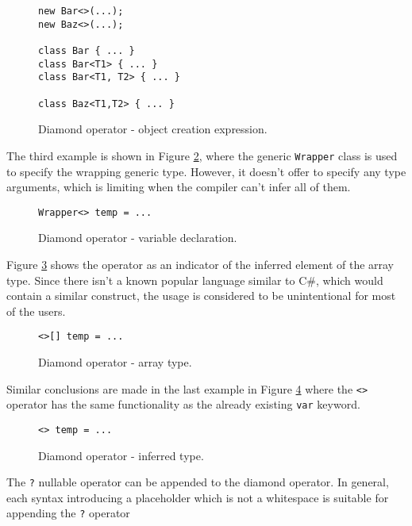 \begin{figure}[h]
\begin{lstlisting}[style=csharp]
new Bar<>(...);
new Baz<>(...);

class Bar { ... }
class Bar<T1> { ... }
class Bar<T1, T2> { ... }

class Baz<T1,T2> { ... }
\end{lstlisting}
\caption{Diamond operator - object creation expression.}
\label{img41:opDi2}
\end{figure}
\par
The third example is shown in Figure \ref{img42:opDi3}, where the generic \texttt{Wrapper} class is used to specify the wrapping generic type. 
However, it doesn’t offer to specify any type arguments, which is limiting when the compiler can’t infer all of them.
\begin{figure}[h]
\begin{lstlisting}[style=csharp]
Wrapper<> temp = ...
\end{lstlisting}
\caption{Diamond operator - variable declaration.}
\label{img42:opDi3}
\end{figure}
\par
Figure \ref{img43:opDi4} shows the operator as an indicator of the inferred element of the array type. 
Since there isn’t a known popular language similar to C\#, which would contain a similar construct, the usage is considered to be unintentional for most of the users.
\begin{figure}[h]
\begin{lstlisting}[style=csharp]
<>[] temp = ...
\end{lstlisting}
\caption{Diamond operator - array type.}
\label{img43:opDi4}
\end{figure}
\par
Similar conclusions are made in the last example in Figure \ref{img44:opDi5} where the \texttt{<>} operator has the same functionality as the already existing \texttt{var} keyword.
\begin{figure}[h!]
\begin{lstlisting}[style=csharp]
<> temp = ...
\end{lstlisting}
\caption{Diamond operator - inferred type.}
\label{img44:opDi5}
\end{figure}
\par
The \texttt{?} nullable operator can be appended to the diamond operator.
In general, each syntax introducing a placeholder which is not a whitespace is suitable for appending the \texttt{?} operator

